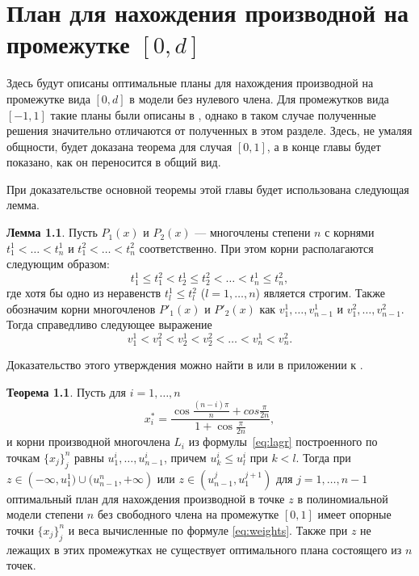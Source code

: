 \documentclass[specialist,
               substylefile = spbu.rtx,
               subf,href,colorlinks=true, 12pt]{disser}
\theoremstyle{definition}
\newtheorem{theorem}{Теорема}
\newtheorem{lemma}{Лемма}
\begin{document}
	
	
  
  \chapter{План для нахождения производной на промежутке $[0, d]$}
  
  Здесь будут описаны оптимальные планы для нахождения производной на промежутке вида $[0, d]$ в модели без нулевого члена. Для промежутков вида $[-1, 1] $ такие планы были описаны в \cite{melasmain}, однако в таком случае полученные решения значительно отличаются от полученных в этом разделе. Здесь, не умаляя общности, будет доказана теорема для случая $[0, 1]$, а в конце главы будет показано, как он переносится в общий вид. 
  
  При доказательстве основной теоремы этой главы будет использована следующая лемма.
  
  \begin{lemma}
  	Пусть $P_1(x)$ и $P_2(x)$ --- многочлены степени $n$ с корнями $t^1_1 < \ldots < t^1_n$ и $t^2_1 < \ldots < t^2_n$ соответственно. При этом корни располагаются следующим образом:
  	\begin{equation*}
  		t^1_1 \leqslant t^2_1 < t^1_2 \leqslant t^2_2 < \ldots < t^1_n \leqslant t^2_n,
  	\end{equation*}
  	где хотя бы одно из неравенств $t_l^1 \leqslant t_l^2$ ($l = 1, \ldots, n$) является строгим. Также обозначим корни многочленов $P'_1(x)$ и $P'_2(x)$ как $v_1^1, \ldots, v_{n-1}^1$ и $v_1^2, \ldots, v_{n-1}^2$. Тогда справедливо следующее выражение
  	\begin{equation*}
  		v^1_1 < v^2_1 < v^1_2 < v^2_2 < \ldots < v^1_n < v^2_n.
  	\end{equation*}
  \end{lemma}
  Доказательство этого утверждения можно найти в \cite{sahmphd} или в приложении к \cite{melasmain}.
	
	\begin{theorem}
		Пусть для $i = 1, \ldots, n$ 
		\begin{equation}
			\label{eq:th1:points}
			x_i^* = \frac{\cos \frac{(n - i) \pi}{n} + cos \frac{\pi}{2n}}{1 + \cos \frac{\pi}{2n}} ,
		\end{equation}
		и корни производной многочлена $L_i$ из формулы~\eqref{eq:lagr} построенного по точкам $\{x_j\}_j^n$ равны $u_1^i, \ldots, u_{n-1}^i$, причем $u_k^i \leqslant u_l^i$ при $k < l$. Тогда при $z \in \left(-\infty, u_1^1) \cup (u_{n-1}^n, +\infty \right)$ или $z \in \left( u_{n-1}^j, u_1^{j+1} \right)$ для $j=1, \ldots, n-1$ оптимальный план для нахождения производной в точке $z$ в полиномиальной модели степени $n$ без свободного члена на промежутке $[0, 1]$ имеет опорные точки $\{x_j\}_j^n$ и веса вычисленные по формуле \eqref{eq:weights}. Также при $z$ не лежащих в этих промежутках не существует оптимального плана состоящего из $n$ точек.
	\end{theorem}
\end{document}
